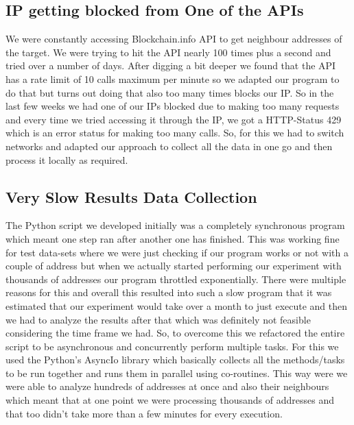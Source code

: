 \documentclass{article}
\begin{document}
    \subsection{IP getting blocked from One of the APIs}
        We were constantly accessing Blockchain.info API to get neighbour addresses of the target. We were trying to hit the API nearly 100 times plus a second and tried over a number of days. After digging a bit deeper we found that the API has a rate limit of 10 calls maximum per minute so we adapted our program to do that but turns out doing that also too many times blocks our IP. So in the last few weeks we had one of our IPs blocked due to making too many requests and every time we tried accessing it through the IP, we got a HTTP-Status 429\cite{Error_429} which is an error status for making too many calls. So, for this we had to switch networks and adapted our approach to collect all the data in one go and then process it locally as required. 
            
    \subsection{Very Slow Results Data Collection}  
        The Python script we developed initially was a completely synchronous program which meant one step ran after another one has finished. This was working fine for test data-sets where we were just checking if our program works or not with a couple of address but when we actually started performing our experiment with thousands of addresses our program throttled exponentially. There were multiple reasons for this and overall this resulted into such a slow program that it was estimated that our experiment would take over a month to just execute and then we had to analyze the results after that which was definitely not feasible considering the time frame we had. So, to overcome this we refactored the entire script to be asynchronous and concurrently perform multiple tasks. For this we used the Python's AsyncIo\cite{asyncio} library which basically collects all the methods/tasks to be run together and runs them in parallel using co-routines. This way were we were able to analyze hundreds of addresses at once and also their neighbours which meant that at one point we were processing thousands of addresses and that too didn't take more than a few minutes for every execution. 
    
\pagebreak
\end{document}
